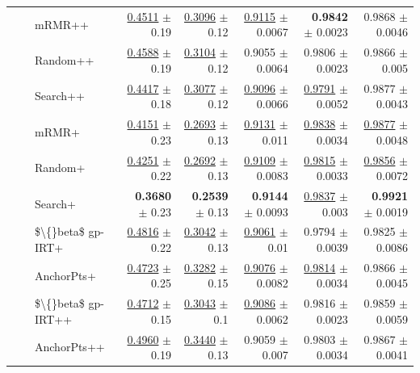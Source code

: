 \begin{longtable}{llp{}rrrrr}
 &  & mRMR++ & \underline{0.4511} {\scriptsize $\pm$ 0.19} & \underline{0.3096} {\scriptsize $\pm$ 0.12} & \underline{0.9115} {\scriptsize $\pm$ 0.0067} & \textbf{0.9842} {\scriptsize $\pm$ 0.0023} & 0.9868 {\scriptsize $\pm$ 0.0046} \\
 &  & Random++ & \underline{0.4588} {\scriptsize $\pm$ 0.19} & \underline{0.3104} {\scriptsize $\pm$ 0.12} & 0.9055 {\scriptsize $\pm$ 0.0064} & 0.9806 {\scriptsize $\pm$ 0.0023} & 0.9866 {\scriptsize $\pm$ 0.005} \\
 &  & Search++ & \underline{0.4417} {\scriptsize $\pm$ 0.18} & \underline{0.3077} {\scriptsize $\pm$ 0.12} & \underline{0.9096} {\scriptsize $\pm$ 0.0066} & \underline{0.9791} {\scriptsize $\pm$ 0.0052} & 0.9877 {\scriptsize $\pm$ 0.0043} \\
 &  & mRMR+ & \underline{0.4151} {\scriptsize $\pm$ 0.23} & \underline{0.2693} {\scriptsize $\pm$ 0.13} & \underline{0.9131} {\scriptsize $\pm$ 0.011} & \underline{0.9838} {\scriptsize $\pm$ 0.0034} & \underline{0.9877} {\scriptsize $\pm$ 0.0048} \\
 &  & Random+ & \underline{0.4251} {\scriptsize $\pm$ 0.22} & \underline{0.2692} {\scriptsize $\pm$ 0.13} & \underline{0.9109} {\scriptsize $\pm$ 0.0083} & \underline{0.9815} {\scriptsize $\pm$ 0.0033} & \underline{0.9856} {\scriptsize $\pm$ 0.0072} \\
 &  & Search+ & \textbf{0.3680} {\scriptsize $\pm$ 0.23} & \textbf{0.2539} {\scriptsize $\pm$ 0.13} & \textbf{0.9144} {\scriptsize $\pm$ 0.0093} & \underline{0.9837} {\scriptsize $\pm$ 0.003} & \textbf{0.9921} {\scriptsize $\pm$ 0.0019} \\
 &  & \$\textbackslash\{\}beta\$ gp-IRT+ & \underline{0.4816} {\scriptsize $\pm$ 0.22} & \underline{0.3042} {\scriptsize $\pm$ 0.13} & \underline{0.9061} {\scriptsize $\pm$ 0.01} & 0.9794 {\scriptsize $\pm$ 0.0039} & 0.9825 {\scriptsize $\pm$ 0.0086} \\
 &  & AnchorPts+ & \underline{0.4723} {\scriptsize $\pm$ 0.25} & \underline{0.3282} {\scriptsize $\pm$ 0.15} & \underline{0.9076} {\scriptsize $\pm$ 0.0082} & \underline{0.9814} {\scriptsize $\pm$ 0.0034} & 0.9866 {\scriptsize $\pm$ 0.0045} \\
 &  & \$\textbackslash\{\}beta\$ gp-IRT++ & \underline{0.4712} {\scriptsize $\pm$ 0.15} & \underline{0.3043} {\scriptsize $\pm$ 0.1} & \underline{0.9086} {\scriptsize $\pm$ 0.0062} & 0.9816 {\scriptsize $\pm$ 0.0023} & 0.9859 {\scriptsize $\pm$ 0.0059} \\
 &  & AnchorPts++ & \underline{0.4960} {\scriptsize $\pm$ 0.19} & \underline{0.3440} {\scriptsize $\pm$ 0.13} & 0.9059 {\scriptsize $\pm$ 0.007} & 0.9803 {\scriptsize $\pm$ 0.0034} & 0.9867 {\scriptsize $\pm$ 0.0041} \\

\end{longtable}
